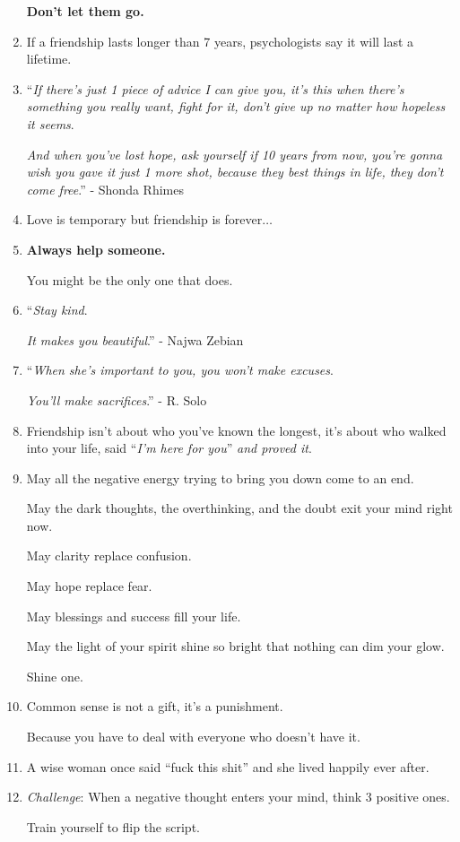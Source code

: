 \documentclass{article}
\begin{document}
\begin{enumerate}
	\textbf{Don't let them go.}
	\item If a friendship lasts longer than 7 years, psychologists say it will last a lifetime.
	\item ``\textit{If there's just 1 piece of advice I can give you, it's this when there's something you really want, fight for it, don't give up no matter how hopeless it seems}.
	
	\textit{And when you've lost hope, ask yourself if 10 years from now, you're gonna wish you gave it just 1 more shot, because they best things in life, they don't come free}.'' - Shonda Rhimes
	\item Love is temporary but friendship is forever$\ldots$
	\item \textbf{Always help someone.}
	
	You might be the only one that does.
	\item ``\textit{Stay kind}.
	
	\textit{It makes you beautiful}.'' - Najwa Zebian
	\item ``\textit{When she's important to you, you won't make excuses}.
	
	\textit{You'll make sacrifices}.'' - R. Solo
	\item Friendship isn't about who you've known the longest, it's about who walked into your life, said ``\textit{I'm here for you}'' \textit{and proved it}.
	\item  May all the negative energy trying to bring you down come to an end.
	
	May the dark thoughts, the overthinking, and the doubt exit your mind right now.
	
	May clarity replace confusion.
	
	May hope replace fear.
	
	May blessings and success fill your life.
	
	May the light of your spirit shine so bright that nothing can dim your glow.
	
	Shine one.
	\item Common sense is not a gift, it's a punishment.
	
	Because you have to deal with everyone who doesn't have it.
	\item A wise woman once said ``fuck this shit'' and she lived happily ever after.
	\item \textit{Challenge}: When a negative thought enters your mind, think 3 positive ones.
	
	Train yourself to flip the script.
	

\end{enumerate}
\end{document}
